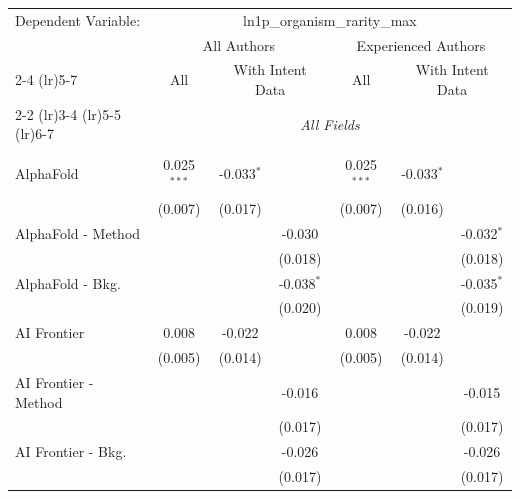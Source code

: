 \begingroup
\centering
\begin{tabular}{lcccccc}
   \tabularnewline \midrule \midrule
   Dependent Variable: & \multicolumn{6}{c}{ln1p\_organism\_rarity\_max}\\
 & \multicolumn{3}{c}{All Authors} & \multicolumn{3}{c}{Experienced Authors} \\
\cmidrule(lr){2-4} \cmidrule(lr){5-7}
 & \multicolumn{1}{c}{All} & \multicolumn{2}{c}{With Intent Data} & \multicolumn{1}{c}{All} & \multicolumn{2}{c}{With Intent Data} \\
\cmidrule(lr){2-2} \cmidrule(lr){3-4} \cmidrule(lr){5-5} \cmidrule(lr){6-7}
 & \multicolumn{6}{c}{\textit{All Fields}} \\ \\
   AlphaFold            & 0.025$^{***}$ & -0.033$^{*}$ &              & 0.025$^{***}$ & -0.033$^{*}$ &   \\   
                        & (0.007)       & (0.017)      &              & (0.007)       & (0.016)      &   \\   
   AlphaFold - Method   &               &              & -0.030       &               &              & -0.032$^{*}$\\   
                        &               &              & (0.018)      &               &              & (0.018)\\   
   AlphaFold - Bkg.     &               &              & -0.038$^{*}$ &               &              & -0.035$^{*}$\\   
                        &               &              & (0.020)      &               &              & (0.019)\\   
   AI Frontier          & 0.008         & -0.022       &              & 0.008         & -0.022       &   \\   
                        & (0.005)       & (0.014)      &              & (0.005)       & (0.014)      &   \\   
   AI Frontier - Method &               &              & -0.016       &               &              & -0.015\\   
                        &               &              & (0.017)      &               &              & (0.017)\\   
   AI Frontier - Bkg.   &               &              & -0.026       &               &              & -0.026\\   
                        &               &              & (0.017)      &               &              & (0.017)\\   

\end{tabular}
